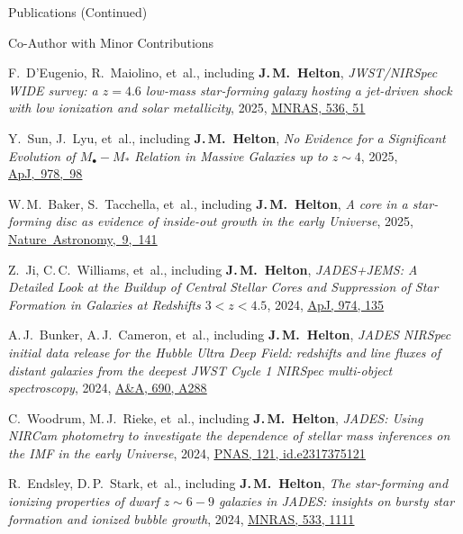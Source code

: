 \documentclass{JMH_CV}
\begin{document}
\begin{rSection}{Publications (Continued)}
\begin{rSubsection}{Co-Author with Minor Contributions}{}{}{}
\begin{etaremune}
    \item F.~D'Eugenio, R.~Maiolino, et~al., including \textbf{J.\,M.~Helton}, \textit{JWST/NIRSpec WIDE survey: a $\mathit{z = 4.6}$ low-mass star-forming galaxy hosting a jet-driven shock with low ionization and solar metallicity}, 2025, \href{https://www.scixplorer.org/abs/2025MNRAS.536...51D/abstract}{\ul{MNRAS, 536, 51}}

    \item Y.~Sun, J.~Lyu, et~al., including \textbf{J.\,M.~Helton}, \textit{No Evidence for a Significant \mbox{Evolution} of $\mathit{M_{\bullet}-M_{\ast}}$ Relation in Massive Galaxies up to $\mathit{z \sim 4}$}, 2025, \href{https://www.scixplorer.org/abs/2025ApJ...978...98S/abstract}{\ul{\mbox{ApJ, 978, 98}}}

    \item W.\,M.~Baker, S.~Tacchella, et~al., including \textbf{J.\,M.~Helton}, \textit{A core in a star-forming disc as evidence of inside-out growth in the early Universe}, 2025, \href{https://www.scixplorer.org/abs/2025NatAs...9..141B/abstract}{\ul{\mbox{Nature Astronomy, 9, 141}}}

    \item Z.~Ji, C.\,C.~Williams, et~al., including \textbf{J.\,M.~Helton}, \textit{JADES+JEMS: A Detailed Look at the Buildup of Central Stellar Cores and Suppression of Star Formation in Galaxies at Redshifts $\mathit{3 < z < 4.5}$}, 2024, \href{https://www.scixplorer.org/abs/2024ApJ...974..135J/abstract}{\ul{ApJ, 974, 135}}

    \item A.\,J.~Bunker, A.\,J.~Cameron, et~al., including \textbf{J.\,M.~Helton}, \textit{JADES NIRSpec initial data release for the Hubble Ultra Deep Field: redshifts and line fluxes of distant galaxies from the deepest JWST Cycle 1 NIRSpec multi-object spectroscopy}, 2024, \href{https://www.scixplorer.org/abs/2024A&A...690A.288B/abstract}{\ul{A\&A, 690, A288}}

    \item C.~Woodrum, M.\,J.~Rieke, et~al., including \textbf{J.\,M.~Helton}, \textit{JADES: Using NIRCam photometry to investigate the dependence of stellar mass inferences on the IMF in the early Universe}, 2024, \href{https://www.scixplorer.org/abs/2024PNAS..12117375W/abstract}{\ul{PNAS, 121, id.e2317375121}}

    \item R.~Endsley, D.\,P.~Stark, et~al., including \textbf{J.\,M.~Helton}, \textit{The star-forming and \mbox{ionizing} properties of dwarf $\mathit{z \sim 6-9}$ galaxies in JADES: insights on bursty star formation and ionized bubble growth}, 2024, \href{https://www.scixplorer.org/abs/2024MNRAS.533.1111E/abstract}{\ul{MNRAS, 533, 1111}}


\end{etaremune}
\end{rSubsection}
\end{rSection}
\end{document}
